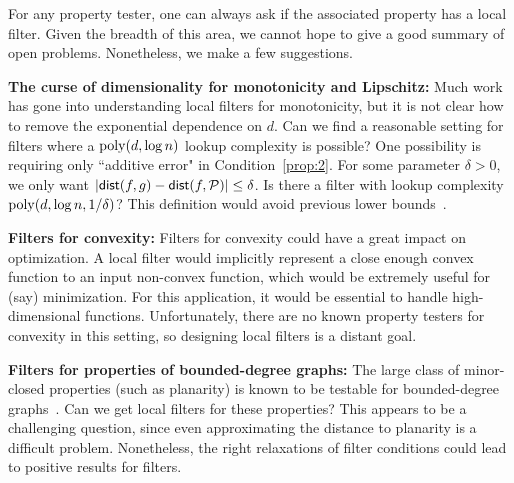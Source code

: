 \documentclass[natbib]{svcyclop}
\def\dist{{\sf dist}}
\begin{document}
\OpenProb

For any property tester, one can always ask if the associated property has a local filter.
Given the breadth of this area, we cannot hope to give a good summary of open problems. Nonetheless,
we make a few suggestions.

{\bf The curse of dimensionality for monotonicity and Lipschitz:} Much work has gone into understanding local filters
for monotonicity, but it is not clear how to remove the exponential dependence on $d$.
Can we find a reasonable setting for filters where a $\mathrm{poly}(d,\log n)$ lookup complexity is possible? One possibility is requiring only ``additive error" in Condition~\ref{prop:2}.
For some parameter $\delta > 0$, we only want $|\dist(f,g) - \dist(f,\cP)| \leq \delta$. Is there a filter
with lookup complexity $\mathrm{poly}(d,\log n,1/\delta)$? This definition would avoid previous lower bounds~\cite{AwJh+12}.
%
%

{\bf Filters for convexity:} Filters for convexity could have a great impact on optimization.
A local filter would implicitly represent a close enough convex function to an input non-convex function,
which would be extremely useful for (say) minimization. For this application, it would be essential
to handle high-dimensional functions. Unfortunately, there are no known property testers for convexity in this setting,
so designing local filters is a distant goal.

{\bf Filters for properties of bounded-degree graphs:} The large class of minor-closed properties (such as planarity)
is known to be testable for bounded-degree graphs~\cite{BSS08}. Can we get local filters for these properties? This appears to 
be a challenging question, since even approximating the distance to planarity is a difficult problem.
Nonetheless, the right relaxations of filter conditions could lead to positive results for filters.



%
%
%
%
\end{document}
